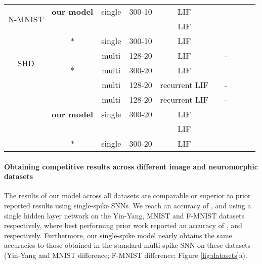 \documentclass{article} \usepackage{iclr2023_conference,times}
\begin{document}
\begin{table}[h]
\begin{center}
{\begin{tabular}{cccccccccc}
\multicolumn{1}{c}{\multirow{2}{*}{N-MNIST}}
&\multicolumn{1}{c}{\multirow{1}{*}{\textbf{our model}}} &single &300-10 &LIF & &\\
    &&&&LIF & &\\
	& \cite{neftci2019surrogate}* &single &300-10 &LIF & &\\
\hline

\multicolumn{1}{c}{\multirow{2}{*}{SHD}}
& \cite{cramer2020heidelberg} &multi &128-20 &LIF &&-\\
& \cite{neftci2019surrogate}* &multi &300-20 &LIF &&\\
& \cite{cramer2020heidelberg} &multi &128-20 &recurrent LIF &&-\\
& \cite{perez2021neural} &multi &128-20 &recurrent LIF &&-\\
\cline{2-7}
&\multicolumn{1}{c}{\multirow{1}{*}{\textbf{our model}}} &single &300-20 &LIF & &\\
    &&&&LIF & & \\
& \cite{neftci2019surrogate}* &single &300-20 &LIF & &\\
\hline
\end{tabular}}
\end{center}
\end{table}

\paragraph{Obtaining competitive results across different image and neuromorphic datasets} The results of our model across all datasets are comparable or superior to prior reported results using single-spike SNNs. We reach an accuracy of ,  and  using a single hidden layer network on the Yin-Yang, MNIST and F-MNIST datasets respectively, where best performing prior work reported an accuracy of ,  and  respectively. Furthermore, our single-spike model nearly obtains the same accuracies to those obtained in the standard multi-spike SNN on these datasets (Yin-Yang and MNIST  difference; F-MNIST  difference; Figure \ref{fig:datasets}a).
\end{document}
